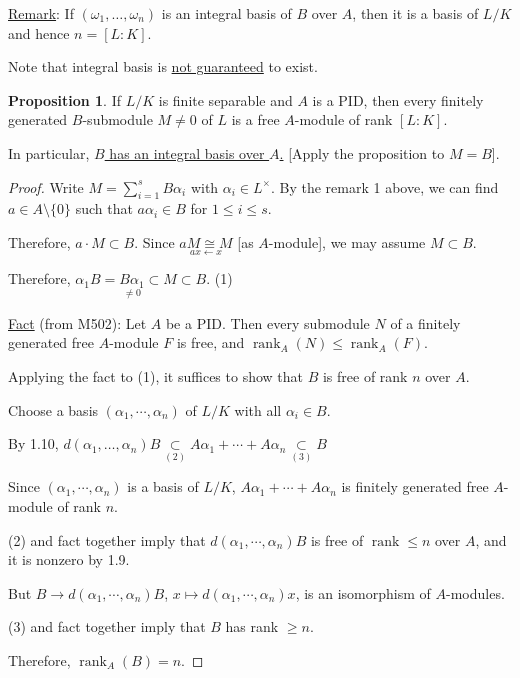 \documentclass[openany]{amsbook}
\numberwithin{section}{chapter}
\theoremstyle{definition}
\newtheorem{proposition}[theorem]{Proposition}
\newcommand{\rank}{\operatorname{rank}}
\begin{document}
\underline{Remark}: If \((\omega_1, \dots , \omega_n)\) is an integral basis of \(B\) over \(A\), then it is a basis of \(L / K\) and hence \(n = [L : K]\).

Note that integral basis is \underline{not guaranteed} to exist.

\begin{proposition}
    If \(L / K\) is finite separable and \(A\) is a PID, then every finitely generated \(B\)-submodule \(M \neq 0\) of \(L\) is a free \(A\)-module of rank \([L : K]\).

    In particular, \underline{\(B\) has an integral basis over \(A\).} [Apply the proposition to \(M = B\)].
\end{proposition}

\begin{proof}
    Write \(M = \sum_{i=1}^{s} B \alpha_i\) with \(\alpha_i \in L^\times\). By the remark 1 above, we can find \(a \in A \setminus \{ 0 \} \) such that \(a \alpha_i \in B\) for \(1 \leq i \leq s\).

    Therefore, \(a \cdot M \subset B\). Since \(\underset{ax \leftarrow x}{aM \cong M} \) [as \(A\)-module], we may assume \(M \subset B\). 
    
    Therefore, \(\alpha_1 B = \underset{\neq 0}{B \alpha_1} \subset M \subset B\). (1)

    \underline{Fact} (from M502): Let \(A\) be a PID. Then every submodule \(N\) of a finitely generated free \(A\)-module \(F\) is free, and \(\rank_A(N) \leq \rank_A(F)\).

    Applying the fact to (1), it suffices to show that \(B\) is free of rank \(n\) over \(A\).

    Choose a basis \((\alpha_1, \cdots, \alpha_n)\) of \(L / K\) with all \(\alpha_i \in B\).
    
    By 1.10, \(d(\alpha_1, \dots , \alpha_n) B \underset{(2)}{\subset} A \alpha_1 + \cdots + A \alpha_n \underset{(3)}{\subset} B\) 

    Since \((\alpha_1, \cdots, \alpha_n)\) is a basis of \(L / K\), \(A \alpha_1 + \cdots + A \alpha_n\) is finitely generated free \(A\)-module of rank \(n\).
    
    (2) and fact together imply that \(d(\alpha_1, \cdots, \alpha_n) B\) is free of \(\rank \leq n\) over \(A\), and it is nonzero by 1.9.

    But \(B \to d(\alpha_1, \cdots, \alpha_n)B\), \(x \mapsto d(\alpha_1, \cdots, \alpha_n)x\), is an isomorphism of \(A\)-modules.
    
    (3) and fact together imply that \(B\) has rank \(\geq n\). 

    Therefore, \(\rank_A(B) = n\).

\end{proof}
\end{document}
